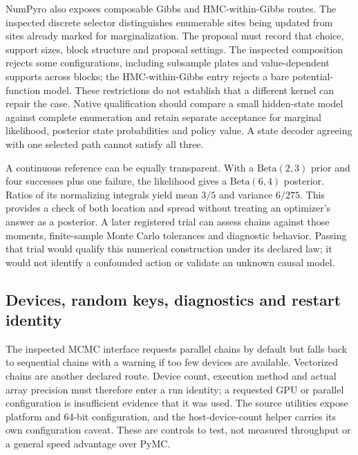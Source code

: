 NumPyro also exposes composable Gibbs and HMC-within-Gibbs routes. The inspected discrete selector distinguishes enumerable sites being updated from sites already marked for marginalization. The proposal must record that choice, support sizes, block structure and proposal settings. The inspected composition rejects some configurations, including subsample plates and value-dependent supports across blocks; the HMC-within-Gibbs entry rejects a bare potential-function model. These restrictions do not establish that a different kernel can repair the case. Native qualification should compare a small hidden-state model against complete enumeration and retain separate acceptance for marginal likelihood, posterior state probabilities and policy value. A state decoder agreeing with one selected path cannot satisfy all three. \citep{exec23_numpyro_sources}

A continuous reference can be equally transparent. With a $\mathrm{Beta}(2,3)$ prior and four successes plus one failure, the likelihood gives a $\mathrm{Beta}(6,4)$ posterior. Ratios of its normalizing integrals yield mean $3/5$ and variance $6/275$. This provides a check of both location and spread without treating an optimizer's answer as a posterior. A later registered trial can assess chains against those moments, finite-sample Monte Carlo tolerances and diagnostic behavior. Passing that trial would qualify this numerical construction under its declared law; it would not identify a confounded action or validate an unknown causal model. \citep{exec23_numpyro_reference}

\subsection{Devices, random keys, diagnostics and restart identity}

The inspected MCMC interface requests parallel chains by default but falls back to sequential chains with a warning if too few devices are available. Vectorized chains are another declared route. Device count, execution method and actual array precision must therefore enter a run identity; a requested GPU or parallel configuration is insufficient evidence that it was used. The source utilities expose platform and 64-bit configuration, and the host-device-count helper carries its own configuration caveat. These are controls to test, not measured throughput or a general speed advantage over PyMC. \citep{exec23_numpyro_sources}

